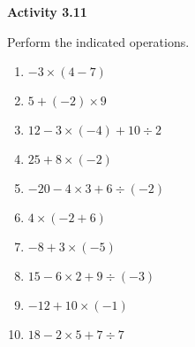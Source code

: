 \vspace{0.3ex}
\noindent\textbf{Activity 3.11}

\vspace{0.2ex}

Perform the indicated operations.
\begin{multicols}{2}
\begin{enumerate}[noitemsep, label = \color{blue}\arabic*. ]
\item \(-3 \times (4 - 7)\)
\item \(5 + (-2) \times 9\)
\item \(12 - 3 \times (-4) + 10 \div 2\)
\item \(25 + 8 \times (-2)\)
\item \(-20 - 4 \times 3 + 6 \div (-2)\)
\item \(4 \times (-2 + 6)\)
\item \(-8 + 3 \times (-5)\)
\item \(15 - 6 \times 2 + 9 \div (-3)\)
\item \(-12 + 10 \times (-1)\)
\item \(18 - 2 \times 5 + 7 \div 7\)
\end{enumerate}
\end{multicols}
